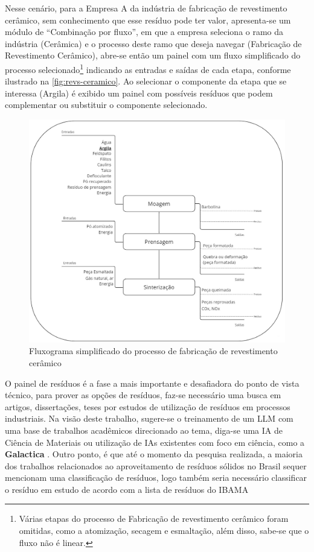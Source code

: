 Nesse cenário, para a Empresa A da indústria de fabricação de revestimento cerâmico, sem conhecimento que esse resíduo pode ter valor, apresenta-se um módulo de “Combinação por fluxo”, em que a empresa seleciona o ramo da indústria (Cerâmica) e o processo deste ramo que deseja navegar (Fabricação de Revestimento Cerâmico), abre-se então um painel com um fluxo simplificado do processo selecionado\footnote{Várias etapas do processo de Fabricação de revestimento cerâmico foram omitidas, como a atomização, secagem e esmaltação, além disso, sabe-se que o fluxo não é linear.}  indicando as entradas e saídas de cada etapa, conforme ilustrado na \autoref{fig:revs-ceramico}. Ao selecionar o componente da etapa que se interessa (Argila) é exibido um painel com possíveis resíduos que podem complementar ou substituir o componente selecionado. 

\begin{figure}[htb]
	\caption{\label{fig:revs-ceramico} Fluxograma simplificado do processo de fabricação de revestimento cerâmico}
	\begin{center}
		\includegraphics[scale=0.46]{images/revs-ceramico.jpg}
	\end{center}
\end{figure}

O painel de resíduos é a fase a mais importante e desafiadora do ponto de vista técnico, para prover as opções de resíduos, faz-se necessário uma busca em artigos, dissertações, teses por estudos de utilização de resíduos em processos industriais. Na visão deste trabalho, sugere-se o treinamento de um \gls{LLM} com uma base de trabalhos acadêmicos direcionado ao tema, diga-se uma \gls{IA} de Ciência de Materiais ou utilização de \gls{IA}s existentes com foco em ciência, como a \textbf{Galactica} \cite{taylor_galactica_2022}. Outro ponto, é que até o momento da pesquisa realizada, a maioria dos trabalhos relacionados ao aproveitamento de resíduos sólidos no Brasil sequer mencionam uma classificação de resíduos, logo também seria necessário classificar o resíduo em estudo de acordo com a lista de resíduos do \gls{IBAMA}

